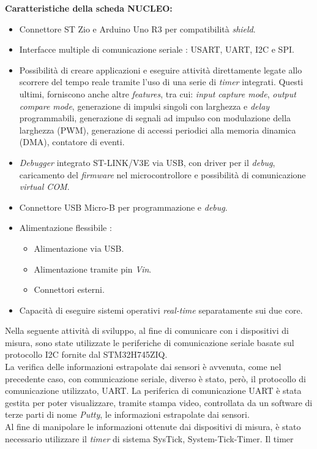 \documentclass[11pt]{report}
\begin{document}
\textbf{Caratteristiche della scheda NUCLEO:}
\begin{itemize}
    \item Connettore ST Zio e Arduino Uno R3 per compatibilità \textit{shield}.
    \item Interfacce multiple di comunicazione seriale : USART, UART, I2C e SPI.
    \item Possibilità di creare applicazioni e eseguire attività direttamente legate allo scorrere del tempo reale tramite l'uso di una serie di \textit{timer} integrati. Questi ultimi, forniscono anche altre  \textit{features}, tra cui: \textit{input capture mode}, \textit{output compare mode}, generazione di impulsi singoli con larghezza e \textit{delay} programmabili, generazione di segnali ad impulso con modulazione della larghezza (PWM), generazione di accessi periodici alla memoria dinamica (DMA), contatore di eventi.
    \item \textit{Debugger} integrato ST-LINK/V3E via USB, con driver per il \textit{debug}, caricamento del \textit{firmware} nel microcontrollore e possibilità di comunicazione \textit{virtual COM}.
    \item Connettore USB Micro-B per programmazione e \textit{debug}.
    \item Alimentazione flessibile :
    \begin{itemize}
        \item Alimentazione via USB.
        \item Alimentazione tramite pin \textit{Vin}.
        \item Connettori esterni.
    \end{itemize}
    \item Capacità di eseguire sistemi operativi \textit{real-time} separatamente sui due core.
\end{itemize}
Nella seguente attività di sviluppo, al fine di comunicare con i dispositivi di misura, sono state utilizzate le periferiche di comunicazione seriale basate sul protocollo 
I2C fornite dal STM32H745ZIQ. \\
La verifica delle informazioni estrapolate dai sensori è avvenuta, come nel precedente caso, con comunicazione seriale, diverso è stato, però, il
protocollo di comunicazione utilizzato, UART. La periferica di comunicazione UART è stata gestita per poter visualizzare, tramite stampa video, controllata da un software di 
terze parti di nome \textit{Putty}, le informazioni estrapolate dai sensori.\\  
Al fine di manipolare le informazioni ottenute dai dispositivi di misura, è stato necessario utilizzare il \textit{timer} di sistema SysTick, System-Tick-Timer. Il timer
\end{document}
